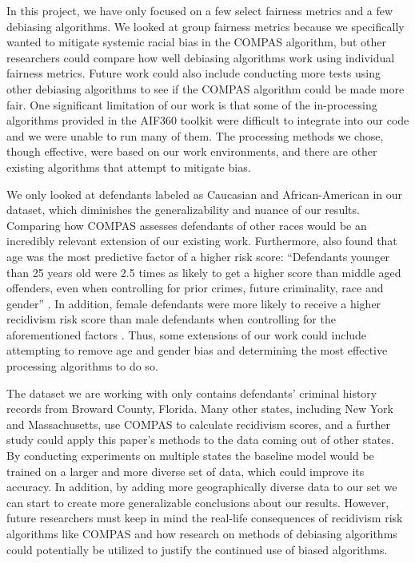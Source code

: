\documentclass[water,article,submit,moreauthors,pdftex]{mdpi}
\begin{document}
In this project, we have only focused on a few select fairness metrics
and a few debiasing algorithms. We looked at group fairness metrics
because we specifically wanted to mitigate systemic racial bias in the
COMPAS algorithm, but other researchers could compare how well debiasing
algorithms work using individual fairness metrics. Future work could
also include conducting more tests using other debiasing algorithms to
see if the COMPAS algorithm could be made more fair. One significant
limitation of our work is that some of the in-processing algorithms
provided in the AIF360 toolkit were difficult to integrate into our code
and we were unable to run many of them. The processing methods we chose,
though effective, were based on our work environments, and there are
other existing algorithms that attempt to mitigate bias.

We only looked at defendants labeled as Caucasian and African-American
in our dataset, which diminishes the generalizability and nuance of our
results. Comparing how COMPAS assesses defendants of other races would
be an incredibly relevant extension of our existing work. Furthermore,
\citet{larson2016we} also found that age was the most predictive factor
of a higher risk score: ``Defendants younger than 25 years old were 2.5
times as likely to get a higher score than middle aged offenders, even
when controlling for prior crimes, future criminality, race and gender''
\citep{larson2016we}. In addition, female defendants were more likely to
receive a higher recidivism risk score than male defendants when
controlling for the aforementioned factors \citep{larson2016we}. Thus,
some extensions of our work could include attempting to remove age and
gender bias and determining the most effective processing algorithms to
do so.

The dataset we are working with only contains defendants' criminal
history records from Broward County, Florida. Many other states,
including New York and Massachusetts, use COMPAS to calculate recidivism
scores, and a further study could apply this paper's methods to the data
coming out of other states. By conducting experiments on multiple states
the baseline model would be trained on a larger and more diverse set of
data, which could improve its accuracy. In addition, by adding more
geographically diverse data to our set we can start to create more
generalizable conclusions about our results. However, future researchers
must keep in mind the real-life consequences of recidivism risk
algorithms like COMPAS and how research on methods of debiasing
algorithms could potentially be utilized to justify the continued use of
biased algorithms.
\end{document}
